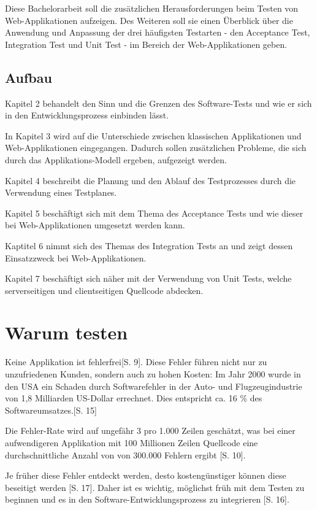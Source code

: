 \documentclass[a4paper,bibtotoc,oneside]{scrbook}
\begin{document}
Diese Bachelorarbeit soll die zusätzlichen Herausforderungen beim Testen von Web-Applikationen aufzeigen. Des Weiteren soll sie einen Überblick über die Anwendung und Anpassung der drei häufigsten Testarten - den Acceptance Test, Integration Test und Unit Test - im Bereich der Web-Applikationen geben.


\section{Aufbau}
Kapitel 2 behandelt den Sinn und die Grenzen des Software-Tests und wie er sich in den Entwicklungsprozess einbinden lässt.

In Kapitel 3 wird auf die Unterschiede zwischen klassischen Applikationen und Web-Applikationen eingegangen. Dadurch sollen zusätzlichen Probleme, die sich durch das Applikations-Modell ergeben, aufgezeigt werden.

Kapitel 4 beschreibt die Planung und den Ablauf des Testprozesses durch die Verwendung eines Testplanes.

Kapitel 5 beschäftigt sich mit dem Thema des Acceptance Tests und wie dieser bei Web-Applikationen umgesetzt werden kann.

Kaptitel 6 nimmt sich des Themas des Integration Tests an und zeigt dessen Einsatzzweck bei Web-Applikationen.

Kapitel 7 beschäftigt sich näher mit der Verwendung von Unit Tests, welche serverseitigen und clientseitigen Quellcode abdecken.


\chapter{Warum testen}
Keine Applikation ist fehlerfrei\cite{empiric_invest}[S. 9]. Diese Fehler  führen nicht nur zu unzufriedenen Kunden, sondern auch zu hohen Kosten: \glqq Im Jahr 2000 wurde in den USA ein Schaden durch Softwarefehler in der Auto- und Flugzeugindustrie von 1,8 Milliarden US-Dollar errechnet. Dies entspricht ca. 16 \% des Softwareumsatzes.\grqq\cite{betrieb}[S. 15]

Die Fehler-Rate wird auf ungefähr 3 pro 1.000 Zeilen geschätzt, was bei einer aufwendigeren Applikation mit 100 Millionen Zeilen Quellcode eine durchschnittliche Anzahl von von 300.000 Fehlern ergibt \cite{eval_regression}[S. 10]. 

Je früher diese Fehler entdeckt werden, desto kostengünstiger können diese beseitigt werden \cite{betrieb}[S. 17]. Daher ist es wichtig, möglichst früh mit dem Testen zu beginnen und es in den Software-Entwicklungsprozess zu integrieren \cite{betrieb}[S. 16]. 
\end{document}

